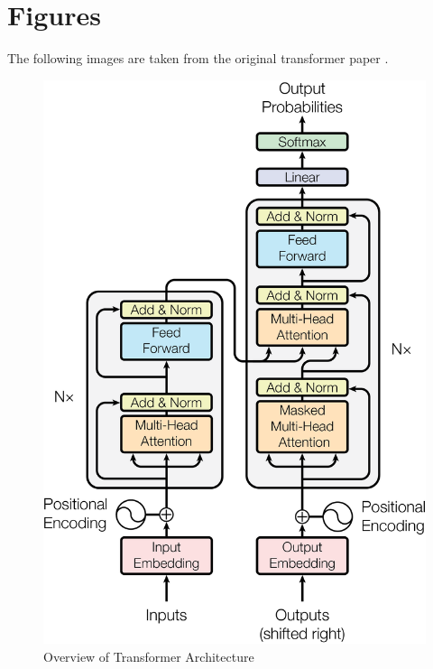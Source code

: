 \documentclass{article}
\begin{document}
\section{Figures}
The following images are taken from the original transformer paper \cite{vaswani2017attention}.


\begin{figure}[H]
    \centering
    \includegraphics[scale=0.27]{Transformer.png}
    \caption{Overview of Transformer Architecture}
    \label{fig:transformer_overview}
\end{figure}
\end{document}
